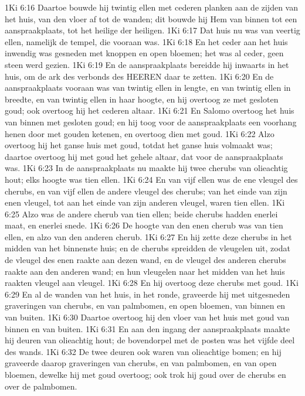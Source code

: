 1Ki 6:16  Daartoe bouwde hij twintig ellen met cederen planken aan de zijden van het huis, van den vloer af tot de wanden; dit bouwde hij Hem van binnen tot een aanspraakplaats, tot het heilige der heiligen.
1Ki 6:17  Dat huis nu was van veertig ellen, namelijk de tempel, die vooraan was.
1Ki 6:18  En het ceder aan het huis inwendig was gesneden met knoppen en open bloemen; het was al ceder, geen steen werd gezien.
1Ki 6:19  En de aanspraakplaats bereidde hij inwaarts in het huis, om de ark des verbonds des HEEREN daar te zetten.
1Ki 6:20  En de aanspraakplaats vooraan was van twintig ellen in lengte, en van twintig ellen in breedte, en van twintig ellen in haar hoogte, en hij overtoog ze met gesloten goud; ook overtoog hij het cederen altaar.
1Ki 6:21  En Salomo overtoog het huis van binnen met gesloten goud; en hij toog voor de aanspraakplaats een voorhang henen door met gouden ketenen, en overtoog dien met goud.
1Ki 6:22  Alzo overtoog hij het ganse huis met goud, totdat het ganse huis volmaakt was; daartoe overtoog hij met goud het gehele altaar, dat voor de aanspraakplaats was.
1Ki 6:23  In de aanspraakplaats nu maakte hij twee cherubs van olieachtig hout; elks hoogte was tien ellen.
1Ki 6:24  En van vijf ellen was de ene vleugel des cherubs, en van vijf ellen de andere vleugel des cherubs; van het einde van zijn enen vleugel, tot aan het einde van zijn anderen vleugel, waren tien ellen.
1Ki 6:25  Alzo was de andere cherub van tien ellen; beide cherubs hadden enerlei maat, en enerlei snede.
1Ki 6:26  De hoogte van den enen cherub was van tien ellen, en alzo van den anderen cherub.
1Ki 6:27  En hij zette deze cherubs in het midden van het binnenste huis; en de cherubs spreidden de vleugelen uit, zodat de vleugel des enen raakte aan dezen wand, en de vleugel des anderen cherubs raakte aan den anderen wand; en hun vleugelen naar het midden van het huis raakten vleugel aan vleugel.
1Ki 6:28  En hij overtoog deze cherubs met goud.
1Ki 6:29  En al de wanden van het huis, in het ronde, graveerde hij met uitgesneden graveringen van cherubs, en van palmbomen, en open bloemen, van binnen en van buiten.
1Ki 6:30  Daartoe overtoog hij den vloer van het huis met goud van binnen en van buiten.
1Ki 6:31  En aan den ingang der aanspraakplaats maakte hij deuren van olieachtig hout; de bovendorpel met de posten was het vijfde deel des wands.
1Ki 6:32  De twee deuren ook waren van olieachtige bomen; en hij graveerde daarop graveringen van cherubs, en van palmbomen, en van open bloemen, dewelke hij met goud overtoog; ook trok hij goud over de cherubs en over de palmbomen.
